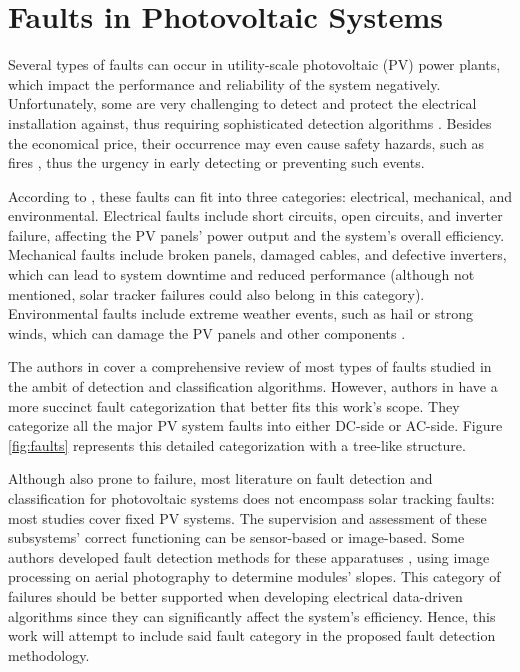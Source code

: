 
\section{Faults in Photovoltaic Systems}

Several types of faults can occur in utility-scale photovoltaic (PV) power plants, which impact the performance and reliability of the system negatively. Unfortunately, some are very challenging to detect and protect the electrical installation against, thus requiring sophisticated detection algorithms \cite{Pillai2018}. Besides the economical price, their occurrence may even cause safety hazards, such as fires \cite{Alam2015}, thus the urgency in early detecting or preventing such events.

According to \cite{Pillai2018}, these faults can fit into three categories: electrical, mechanical, and environmental. Electrical faults include short circuits, open circuits, and inverter failure, affecting the PV panels' power output and the system's overall efficiency. Mechanical faults include broken panels, damaged cables, and defective inverters, which can lead to system downtime and reduced performance (although not mentioned, solar tracker failures could also belong in this category). Environmental faults include extreme weather events, such as hail or strong winds, which can damage the PV panels and other components \cite{faults}.

The authors in \cite{Hong2022} cover a comprehensive review of most types of faults studied in the ambit of detection and classification algorithms. However, authors in \cite{Livera2019} have a more succinct fault categorization that better fits this work's scope. They categorize all the major PV system faults into either DC-side or AC-side. Figure \ref{fig:faults} represents this detailed categorization with a tree-like structure.

Although also prone to failure, most literature on fault detection and classification for photovoltaic systems does not encompass solar tracking faults: most studies cover fixed PV systems. The supervision and assessment of these subsystems' correct functioning can be sensor-based \cite{Stepanov2014} or image-based. Some authors developed fault detection methods for these apparatuses \cite{Amaral2021}, using image processing on aerial photography to determine modules' slopes. This category of failures should be better supported when developing electrical data-driven algorithms since they can significantly affect the system's efficiency. Hence, this work will attempt to include said fault category in the proposed fault detection methodology.

